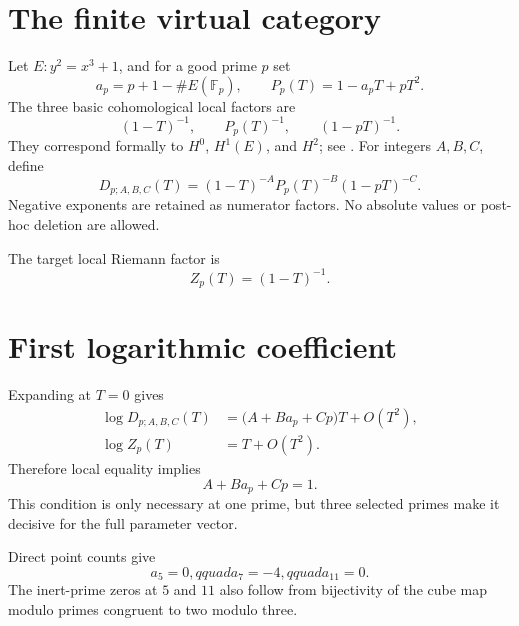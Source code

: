 \documentclass[11pt]{article}
\theoremstyle{remark}\newtheorem{remark}[theorem]{Remark}
\begin{document}
\section{The finite virtual category}
Let \(E:y^2=x^3+1\), and for a good prime \(p\) set
\[
 a_p=p+1-\#E(\mathbb F_p),
 \qquad P_p(T)=1-a_pT+pT^2.
\]
The three basic cohomological local factors are
\[
 (1-T)^{-1},\qquad P_p(T)^{-1},\qquad (1-pT)^{-1}.
\]
They correspond formally to \(H^0\), \(H^1(E)\), and \(H^2\); see
\cite{Milne2026,Serre1965}.  For integers \(A,B,C\), define
\begin{equation}\label{eq:virtual}
 D_{p;A,B,C}(T)
 =(1-T)^{-A}P_p(T)^{-B}(1-pT)^{-C}.
\end{equation}
Negative exponents are retained as numerator factors.  No absolute values or
post-hoc deletion are allowed.

The target local Riemann factor is
\begin{equation}\label{eq:target}
 Z_p(T)=(1-T)^{-1}.
\end{equation}

\section{First logarithmic coefficient}
Expanding at \(T=0\) gives
\begin{align*}
 \log D_{p;A,B,C}(T)
 &=\bigl(A+Ba_p+Cp\bigr)T+O(T^2),\\
 \log Z_p(T)&=T+O(T^2).
\end{align*}
Therefore local equality implies
\begin{equation}\label{eq:linear}
 A+Ba_p+Cp=1.
\end{equation}
This condition is only necessary at one prime, but three selected primes make
it decisive for the full parameter vector.

Direct point counts give
\[
 a_5=0,qquad a_7=-4,qquad a_{11}=0.
\]
The inert-prime zeros at \(5\) and \(11\) also follow from bijectivity of the
cube map modulo primes congruent to two modulo three.
\end{document}
